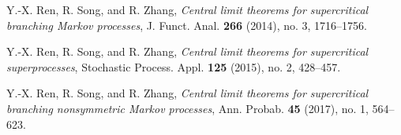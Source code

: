 \documentclass[12pt,a4paper]{amsart}
\theoremstyle{plain}
\theoremstyle{definition}
\numberwithin{equation}{section}
\begin{document}
\begin{thebibliography}{10}
  Y.-X. Ren, R. Song, and R. Zhang,
  \emph{Central limit theorems for supercritical branching {M}arkov processes},
  J. Funct. Anal. \textbf{266} (2014), no. 3, 1716--1756.

  Y.-X. Ren, R. Song, and R. Zhang,
  \emph{Central limit theorems for supercritical superprocesses},
  Stochastic Process. Appl. \textbf{125} (2015), no. 2, 428--457.

  Y.-X. Ren, R. Song, and R. Zhang,
  \emph{Central limit theorems for supercritical branching nonsymmetric {M}arkov processes},
  Ann. Probab. \textbf{45} (2017), no. 1, 564--623.
  
\end{thebibliography}
\end{document}
